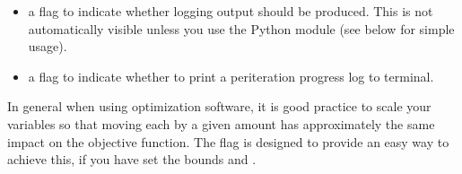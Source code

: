 \documentclass[letterpaper,10pt,english]{sphinxmanual}
\begin{document}
\begin{itemize}
\item {} 
 \sphinxhyphen{} a flag to indicate whether logging output should be produced. This is not automatically visible unless you use the Python  module (see below for simple usage).

\item {} 
 \sphinxhyphen{} a flag to indicate whether to print a per\sphinxhyphen{}iteration progress log to terminal.

\end{itemize}

In general when using optimization software, it is good practice to scale your variables so that moving each by a given amount has approximately the same impact on the objective function.
The  flag is designed to provide an easy way to achieve this, if you have set the bounds  and .
\end{document}
